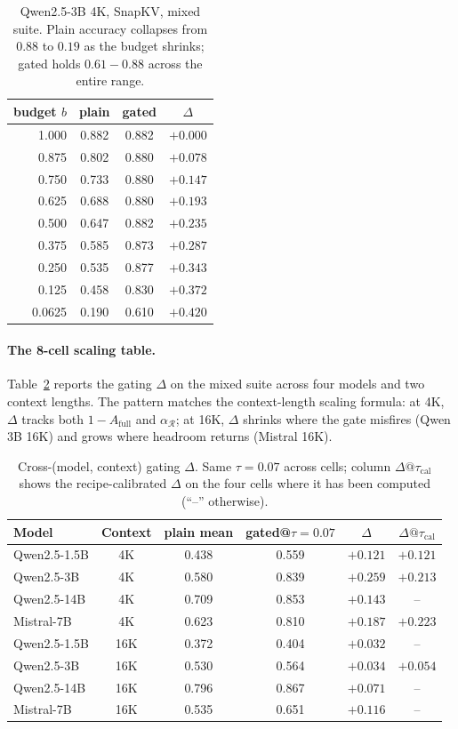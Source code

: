 \documentclass{article}
\begin{document}
\begin{table}[h]
\centering
\caption{Qwen2.5-3B 4K, SnapKV, mixed suite. Plain accuracy collapses
from $0.88$ to $0.19$ as the budget shrinks; gated holds $0.61-0.88$
across the entire range.}
\label{tab:qwen3b-curve}
\begin{tabular}{rccc}
\toprule
budget $b$ & plain & gated & $\Delta$ \\
\midrule
1.000  & 0.882 & 0.882 & $+0.000$ \\
0.875  & 0.802 & 0.880 & $+0.078$ \\
0.750  & 0.733 & 0.880 & $+0.147$ \\
0.625  & 0.688 & 0.880 & $+0.193$ \\
0.500  & 0.647 & 0.882 & $+0.235$ \\
0.375  & 0.585 & 0.873 & $+0.287$ \\
0.250  & 0.535 & 0.877 & $+0.343$ \\
0.125  & 0.458 & 0.830 & $+0.372$ \\
0.0625 & 0.190 & 0.610 & $+0.420$ \\
\bottomrule
\end{tabular}
\end{table}

\paragraph{The 8-cell scaling table.} Table~\ref{tab:scaling} reports the
gating $\Delta$ on the mixed suite across four models and two context
lengths. The pattern matches the context-length scaling formula: at 4K,
$\Delta$ tracks both $1 - A_{\mathrm{full}}$ and $\alpha_{\mathcal{R}}$; at
16K, $\Delta$ shrinks where the gate misfires (Qwen 3B 16K) and grows where
headroom returns (Mistral 16K).

\begin{table}[h]
\centering
\caption{Cross-(model, context) gating $\Delta$. Same $\tau = 0.07$
across cells; column $\Delta@\tau_{\mathrm{cal}}$ shows the recipe-calibrated
$\Delta$ on the four cells where it has been computed (``--'' otherwise).}
\label{tab:scaling}
\begin{tabular}{lccccc}
\toprule
Model & Context & plain mean & gated@$\tau\!=\!0.07$ & $\Delta$ &
$\Delta@\tau_{\mathrm{cal}}$ \\
\midrule
Qwen2.5-1.5B   & 4K  & 0.438 & 0.559 & $+0.121$ & $+0.121$ \\
Qwen2.5-3B     & 4K  & 0.580 & 0.839 & $+0.259$ & $+0.213$ \\
Qwen2.5-14B    & 4K  & 0.709 & 0.853 & $+0.143$ & --       \\
Mistral-7B      & 4K  & 0.623 & 0.810 & $+0.187$ & $+0.223$ \\
\midrule
Qwen2.5-1.5B   & 16K & 0.372 & 0.404 & $+0.032$ & --       \\
Qwen2.5-3B     & 16K & 0.530 & 0.564 & $+0.034$ & $+0.054$ \\
Qwen2.5-14B    & 16K & 0.796 & 0.867 & $+0.071$ & --       \\
Mistral-7B      & 16K & 0.535 & 0.651 & $+0.116$ & --       \\
\bottomrule
\end{tabular}
\end{table}
\end{document}
